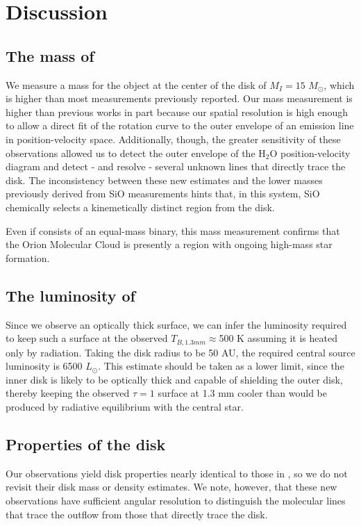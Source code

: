 \documentclass[twocolumn]{aastex61}
\newcommand{\msun}{\ensuremath{M_{\odot}}\xspace}			%
\newcommand{\lsun}{\ensuremath{L_{\odot}}\xspace}			%
\newcommand{\water}{H$_{2}$O\xspace}		%
\begin{document}
\section{Discussion}
\label{sec:discussion}
\subsection{The mass of \sourcei}
We measure a mass for the object at the center of the disk of $M_I=15$
\msun, which is higher than most measurements previously reported.  Our mass
measurement is higher than previous works in part because our spatial
resolution is high enough to allow a direct fit of the rotation curve to the
outer envelope of an emission line in position-velocity space.
Additionally, though, the greater sensitivity of these observations allowed
us to detect the outer envelope of the \water position-velocity diagram
and detect - and resolve - several unknown lines that directly trace the disk.
The inconsistency between these new estimates and the lower masses previously
derived from SiO measurements hints that, in this system, SiO chemically
selects a kinemetically distinct region from the disk.

Even if \sourcei consists of an equal-mass binary, this mass measurement
confirms that the Orion Molecular Cloud is presently a region with ongoing
high-mass star formation.

\subsection{The luminosity of \sourcei}
Since we observe an optically thick surface, we can infer the luminosity
required to keep such a surface at the observed $T_{B,1.3 mm}\approx$500 K assuming
it is heated only by radiation.  Taking the disk radius to be 50 AU,
the required central source luminosity is 6500 \lsun.  This estimate
should be taken as a lower limit, since the inner disk is likely to be
optically thick and capable of shielding the outer disk, thereby
keeping the observed $\tau=1$ surface at 1.3 mm cooler than would
be produced by radiative equilibrium with the central star.

\subsection{Properties of the disk}
Our observations yield disk properties nearly identical to those in
\citet{Plambeck2016a}, so we do not revisit their disk mass or density
estimates.  We note, however, that these new observations have sufficient
angular resolution to distinguish the molecular lines that trace the outflow
from those that directly trace the disk.
\end{document}
